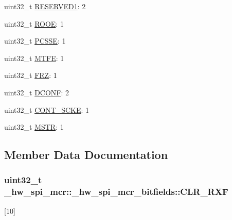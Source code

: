 \begin{DoxyCompactItemize}
uint32\+\_\+t \hyperlink{struct__hw__spi__mcr_1_1__hw__spi__mcr__bitfields_a83b999983fab006055ab8496ef5afa4c}{R\+E\+S\+E\+R\+V\+E\+D1}\+: 2
\item 
uint32\+\_\+t \hyperlink{struct__hw__spi__mcr_1_1__hw__spi__mcr__bitfields_ab48077966cb3a40bf4b1f68873eff7d3}{R\+O\+OE}\+: 1
\item 
uint32\+\_\+t \hyperlink{struct__hw__spi__mcr_1_1__hw__spi__mcr__bitfields_a232c7f81125d5f8c3c5952b3844760b4}{P\+C\+S\+SE}\+: 1
\item 
uint32\+\_\+t \hyperlink{struct__hw__spi__mcr_1_1__hw__spi__mcr__bitfields_a63fc1b074a2863e8ed76f4334bcf7c16}{M\+T\+FE}\+: 1
\item 
uint32\+\_\+t \hyperlink{struct__hw__spi__mcr_1_1__hw__spi__mcr__bitfields_a7000e0e838bd767034b42398e68a1459}{F\+RZ}\+: 1
\item 
uint32\+\_\+t \hyperlink{struct__hw__spi__mcr_1_1__hw__spi__mcr__bitfields_abe74f59fbda4e1f4a1d03ee34f28624a}{D\+C\+O\+NF}\+: 2
\item 
uint32\+\_\+t \hyperlink{struct__hw__spi__mcr_1_1__hw__spi__mcr__bitfields_afd66443c233b59bd4263abfc0ab2f0d5}{C\+O\+N\+T\+\_\+\+S\+C\+KE}\+: 1
\item 
uint32\+\_\+t \hyperlink{struct__hw__spi__mcr_1_1__hw__spi__mcr__bitfields_a6e954adde0da53752cfc6f1d0a449b88}{M\+S\+TR}\+: 1
\end{DoxyCompactItemize}


\subsection{Member Data Documentation}
\subsubsection[{\texorpdfstring{C\+L\+R\+\_\+\+R\+XF}{CLR_RXF}}]{\setlength{\rightskip}{0pt plus 5cm}uint32\+\_\+t \+\_\+hw\+\_\+spi\+\_\+mcr\+::\+\_\+hw\+\_\+spi\+\_\+mcr\+\_\+bitfields\+::\+C\+L\+R\+\_\+\+R\+XF}\hypertarget{struct__hw__spi__mcr_1_1__hw__spi__mcr__bitfields_a8f6ac10b6973ca7de82dc4d65c87289c}{}\label{struct__hw__spi__mcr_1_1__hw__spi__mcr__bitfields_a8f6ac10b6973ca7de82dc4d65c87289c}
\mbox{[}10\mbox{]} 
